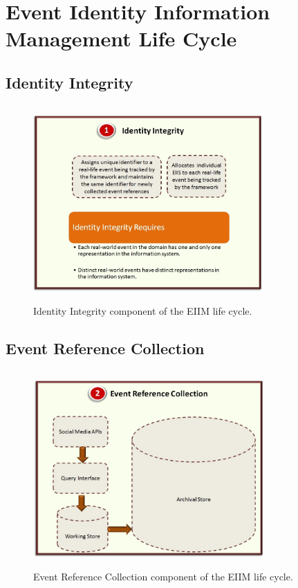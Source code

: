 

\chapter{Event Identity Information Management Life Cycle} %

\label{eiim} %


\section{Identity Integrity}

\begin{figure}[htbp]
  \caption{Identity Integrity component of the EIIM life cycle.}
  \centering
    \includegraphics[width=8.8cm,height=7.5cm]{Figures/EIIMComponents/IdentityIntegrity.jpg}
\end{figure}

\section{Event Reference Collection}

\begin{figure}[htbp]
  \caption{Event Reference Collection component of the EIIM life cycle.}
  \centering
    \includegraphics[width=8.8cm,height=7.5cm]{Figures/EIIMComponents/EventReferenceCollection.jpg}
\end{figure}

